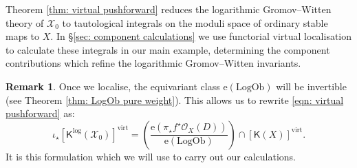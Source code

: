 \documentclass[11pt]{amsart}
\theoremstyle{definition}
\theoremstyle{definition}
\newtheorem{remark}[theorem]{Remark}
\newcommand{\op}[1]{\operatorname{#1}}
\newcommand{\e}{\mathrm{e}}
\newcommand{\PP}{\mathbb{P}}
\newcommand{\OO}{\mathcal{O}}
\newcommand{\virt}{\op{virt}}
\newcommand{\LogOb}{\mathrm{LogOb}}
\newcommand{\Xcal}{\mathcal{X}}
\newcommand{\Kup}{\mathsf{K}}
\begin{document}
Theorem \ref{thm: virtual pushforward} reduces the logarithmic Gromov--Witten theory of $\Xcal_0$ to tautological integrals on the moduli space of ordinary stable maps to $X$. In \S \ref{sec: component calculations} we use functorial virtual localisation to calculate these integrals in our main example, determining the component contributions which refine the logarithmic Gromov--Witten invariants.

\begin{remark} \label{rmk: push forward abuse} Once we localise, the equivariant class $\e(\LogOb)$ will be invertible (see Theorem \ref{thm: LogOb pure weight}). This allows us to rewrite \eqref{eqn: virtual pushforward} as:
\begin{equation} \label{eqn: virtual pushforward fraction} \iota_\star [\Kup^{\log}(\Xcal_0)]^{\virt} = \left( \dfrac{ \e(\pi_\star f^\star \OO_X(D))}{\e(\LogOb)} \right) \cap [\Kup(X)]^{\virt}.\end{equation}
It is this formulation which we will use to carry out our calculations.
\end{remark}

\end{document}
